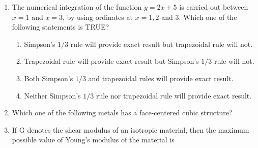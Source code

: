 \documentclass[journal,12pt,onecolumn]{IEEEtran}
\theoremstyle{remark}
\begin{document}
\begin{enumerate}
    \item The numerical integration of the function $y=2x+5$ is carried out between $x=1$ and $x=3$, by using ordinates at $x=1, 2$ and $3$. Which one of the following statements is TRUE?

    \hfill{}
    \begin{enumerate}
        \item Simpson's $1/3$ rule will provide exact result but trapezoidal rule will not.
        \item Trapezoidal rule will provide exact result but Simpson's $1/3$ rule will not.
        \item Both Simpson's $1/3$ and trapezoidal rules will provide exact result.
        \item Neither Simpson's $1/3$ rule nor trapezoidal rule will provide exact result.
    \end{enumerate}

    \item Which one of the following metals has a face-centered cubic  structure?

    \hfill{}
    \begin{enumerate}
    \end{enumerate}

    \item If G denotes the shear modulus of an isotropic material, then the maximum possible value of Young's modulus of the material is

    \hfill{}
    \begin{enumerate}
    \end{enumerate}


\end{enumerate}
\end{document}
